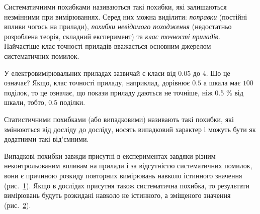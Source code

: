 \documentclass{LabBook}
\begin{document}
Систематичними похибками називаються такі похибки, які залишаються незмінними при вимірюваннях. Серед них можна виділити: \emph{поправки} (постійні впливи чогось на прилади), \emph{похибки невідомого походження} (недостатньо розроблена теорія, складний експеримент) та \emph{клас точності приладів}. Найчастіше клас точності приладів вважається основним джерелом систематичних помилок.

У електровимірювальних приладах зазвичай є класи від $0.05$ до $4$. Що це означає? Якщо, клас точності приладу, наприклад, дорівнює $0.5$ а шкала має $100$ поділок, то це означає, що покази приладу даються не точніше, ніж 0.5 \% від шкали, тобто, $0.5$ поділки.

Статистичними похибками (або випадковими) називають такі похибки, які змінюються від досліду до досліду, носять випадковий характер і можуть бути як додатними такі від'ємними.

Випадкові похибки завжди присутні в експериментах завдяки різним неконтрольованим впливам на прилади і за відсутністю систематичних помилок, вони є причиною розкиду повторних вимірювань навколо істинного значення (рис.~\ref{pic:stat}). Якщо в дослідах присутня також систематична похибка, то результати вимірювань будуть розкидані навколо не істинного, а зміщеного значення (рис.~\ref{pic:system}).

\begin{figure}[h!]\centering

	\begin{subfigure}[b]{0.45\linewidth}\centering
		\caption{}
		\label{pic:stat}
	\end{subfigure}
	\begin{subfigure}[b]{0.45\linewidth}\centering
		\caption{}
		\label{pic:system}
	\end{subfigure}
	\caption{}
	\label{pic:stat+syst_error}
\end{figure}
\end{document}
